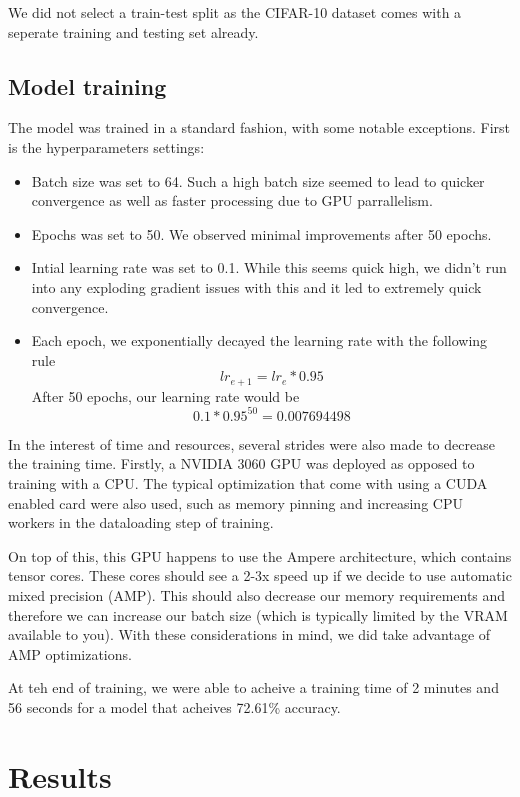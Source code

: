 \documentclass[letterpaper, 12pt]{article}
\begin{document}
We did not select a train-test split as the CIFAR-10 dataset comes with a seperate training and testing set already.

\subsection{Model training}
The model was trained in a standard fashion, with some notable exceptions. First is the hyperparameters settings:

\begin{itemize}
\item Batch size was set to 64. Such a high batch size seemed to lead to quicker convergence as well as faster processing due to GPU parrallelism.
\item Epochs was set to 50. We observed minimal improvements after 50 epochs.
\item Intial learning rate was set to 0.1. While this seems quick high, we didn't run into any exploding gradient issues with this and it led to extremely quick convergence.
\item Each epoch, we exponentially decayed the learning rate with the following rule \[lr_{e+1} = lr_{e} * 0.95\]
After 50 epochs, our learning rate would be \[0.1 * 0.95^{50} = 0.007694498\]
\end{itemize}

In the interest of time and resources, several strides were also made to decrease the training time. Firstly, a NVIDIA 3060 GPU was deployed as opposed to training with a CPU. The typical optimization that come with using a CUDA enabled card were also used, such as memory pinning and increasing CPU workers in the dataloading step of training.

On top of this, this GPU happens to use the Ampere architecture, which contains tensor cores. These cores should see a 2-3x speed up if we decide to use automatic mixed precision (AMP). This should also decrease our memory requirements and therefore we can increase our batch size (which is typically limited by the VRAM available to you). With these considerations in mind, we did take advantage of AMP optimizations.

At teh end of training, we were able to acheive a training time of 2 minutes and 56 seconds for a model that acheives 72.61\% accuracy.


\section{Results}
\end{document}

